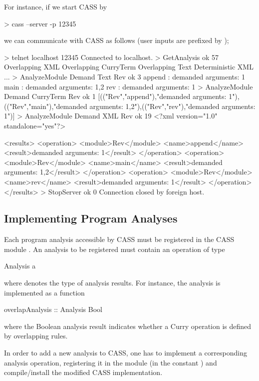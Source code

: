 For instance, if we start CASS by
\begin{curry}
> cass --server -p 12345
\end{curry}
we can communicate with CASS as follows (user inputs are prefixed by \ccode{>});
\begin{curry}
> telnet localhost 12345
Connected to localhost.
> GetAnalysis
ok 57
Overlapping XML
Overlapping CurryTerm
Overlapping Text
Deterministic XML
...
> AnalyzeModule Demand Text Rev
ok 3
append : demanded arguments: 1
main : demanded arguments: 1,2
rev : demanded arguments: 1
> AnalyzeModule Demand CurryTerm Rev
ok 1
[(("Rev","append"),"demanded arguments: 1"),(("Rev","main"),"demanded arguments: 1,2"),(("Rev","rev"),"demanded arguments: 1")]
> AnalyzeModule Demand XML Rev
ok 19
<?xml version="1.0" standalone="yes"?>

<results>
  <operation>
    <module>Rev</module>
    <name>append</name>
    <result>demanded arguments: 1</result>
  </operation>
  <operation>
    <module>Rev</module>
    <name>main</name>
    <result>demanded arguments: 1,2</result>
  </operation>
  <operation>
    <module>Rev</module>
    <name>rev</name>
    <result>demanded arguments: 1</result>
  </operation>
</results>
> StopServer
ok 0
Connection closed by foreign host.
\end{curry}


\subsection{Implementing Program Analyses}

Each program analysis accessible by CASS must be registered
in the CASS module .
An analysis to be registered must contain an operation of type
\begin{curry}
Analysis a
\end{curry}
where  denotes the type of analysis results.
For instance, the  analysis is implemented as a function
\begin{curry}
overlapAnalysis :: Analysis Bool
\end{curry}
where the Boolean analysis result indicates whether a Curry operation
is defined by overlapping rules.

In order to add a new analysis to CASS, one has to implement
a corresponding analysis operation, registering it in the module
 (in the constant )
and compile/install the modified CASS implementation.

